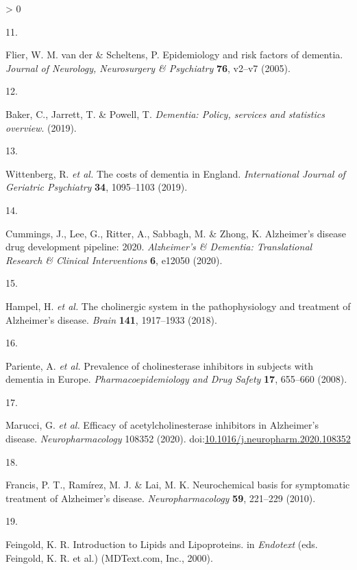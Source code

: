 \documentclass[a4paper, twoside]{templates/ociamthesis}
\newlength{\cslhangindent}
\newlength{\csllabelwidth}
\newenvironment{CSLReferences}[3] %
 {%
  \setlength{\parindent}{0pt}
  \ifodd #1 \everypar{\setlength{\hangindent}{\cslhangindent}}\ignorespaces\fi
  \ifnum #2 > 0
  \setlength{\parskip}{#2\baselineskip}
  \fi
 }%
 {}
\newcommand{\CSLLeftMargin}[1]{\parbox[t]{\maxof{\widthof{#1}}{\csllabelwidth}}{#1}}
\newcommand{\CSLRightInline}[1]{\parbox[t]{\linewidth - \csllabelwidth}{#1}}
\begin{document}
\begin{CSLReferences}{0}{0}
\leavevmode\hypertarget{ref-flier2005}{}%
\CSLLeftMargin{11. }
\CSLRightInline{Flier, W. M. van der \& Scheltens, P. Epidemiology and risk factors of dementia. \emph{Journal of Neurology, Neurosurgery \& Psychiatry} \textbf{76}, v2--v7 (2005).}

\leavevmode\hypertarget{ref-baker2019}{}%
\CSLLeftMargin{12. }
\CSLRightInline{Baker, C., Jarrett, T. \& Powell, T. \emph{Dementia: Policy, services and statistics overview}. (2019).}

\leavevmode\hypertarget{ref-wittenberg2019}{}%
\CSLLeftMargin{13. }
\CSLRightInline{Wittenberg, R. \emph{et al.} The costs of dementia in {England}. \emph{International Journal of Geriatric Psychiatry} \textbf{34}, 1095--1103 (2019).}

\leavevmode\hypertarget{ref-cummings2020}{}%
\CSLLeftMargin{14. }
\CSLRightInline{Cummings, J., Lee, G., Ritter, A., Sabbagh, M. \& Zhong, K. Alzheimer's disease drug development pipeline: 2020. \emph{Alzheimer's \& Dementia: Translational Research \& Clinical Interventions} \textbf{6}, e12050 (2020).}

\leavevmode\hypertarget{ref-hampel2018}{}%
\CSLLeftMargin{15. }
\CSLRightInline{Hampel, H. \emph{et al.} The cholinergic system in the pathophysiology and treatment of {Alzheimer}'s disease. \emph{Brain} \textbf{141}, 1917--1933 (2018).}

\leavevmode\hypertarget{ref-pariente2008}{}%
\CSLLeftMargin{16. }
\CSLRightInline{Pariente, A. \emph{et al.} Prevalence of cholinesterase inhibitors in subjects with dementia in {Europe}. \emph{Pharmacoepidemiology and Drug Safety} \textbf{17}, 655--660 (2008).}

\leavevmode\hypertarget{ref-marucci2020}{}%
\CSLLeftMargin{17. }
\CSLRightInline{Marucci, G. \emph{et al.} Efficacy of acetylcholinesterase inhibitors in {Alzheimer}'s disease. \emph{Neuropharmacology} 108352 (2020). doi:\href{https://doi.org/10.1016/j.neuropharm.2020.108352}{10.1016/j.neuropharm.2020.108352}}

\leavevmode\hypertarget{ref-francis2010}{}%
\CSLLeftMargin{18. }
\CSLRightInline{Francis, P. T., Ramírez, M. J. \& Lai, M. K. Neurochemical basis for symptomatic treatment of {Alzheimer}'s disease. \emph{Neuropharmacology} \textbf{59}, 221--229 (2010).}

\leavevmode\hypertarget{ref-feingold2000}{}%
\CSLLeftMargin{19. }
\CSLRightInline{Feingold, K. R. Introduction to {Lipids} and {Lipoproteins}. in \emph{Endotext} (eds. Feingold, K. R. et al.) ({MDText.com, Inc.}, 2000).}


\end{CSLReferences}
\end{document}
